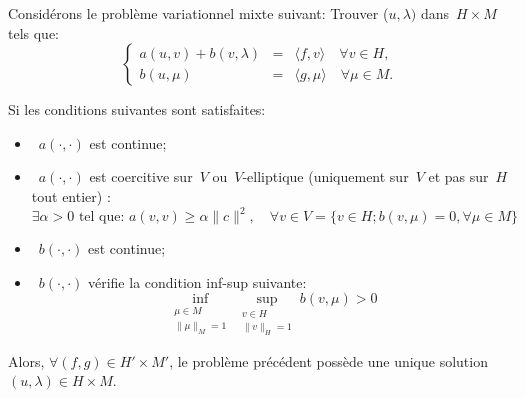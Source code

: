\label{Sec:Brezzi}

\medskip
\begin{theoreme}
Considérons le problème variationnel mixte suivant:
Trouver ($u, \lambda)$ dans~$H\times M$ tels que:
 \begin{equation}\label{Eq-PM}\left\{
\begin{array}{rcl}
 a(u,v) + b(v, \lambda) &=& \langle f,v\rangle \quad \forall v\in H,\\
b(u,\mu) &=& \langle g,\mu\rangle \quad \forall \mu \in M.
\end{array}\right.
\end{equation}

Si les conditions suivantes sont satisfaites:
\begin{itemize}
  \item~$a(\cdot,\cdot)$ est continue;
  \item~$a(\cdot,\cdot)$ est coercitive sur~$V$ ou~$V$-elliptique (uniquement sur~$V$ et pas sur~$H$ tout entier) :
  \begin{equation}\exists \alpha> 0 \text{ tel que: } a(v,v)\ge\alpha\|c\|^2, \quad \forall v\in V=\{v\in H; b(v,\mu)=0, \forall \mu\in M \}\end{equation}
  \item~$b(\cdot,\cdot)$ est continue;
  \item~$b(\cdot,\cdot)$ vérifie la condition inf-sup suivante:
\begin{equation}\inf_{\substack{\mu\in M\\\|\mu\|_M=1}} \sup_{\substack{v\in H\\\|v\|_H=1}} b(v,\mu) > 0\end{equation}
\end{itemize}
Alors, $\forall (f,g)\in H'\times M'$, le problème précédent possède une unique solution
$(u,\lambda) \in H\times M$.
\end{theoreme}

\medskip
{}


